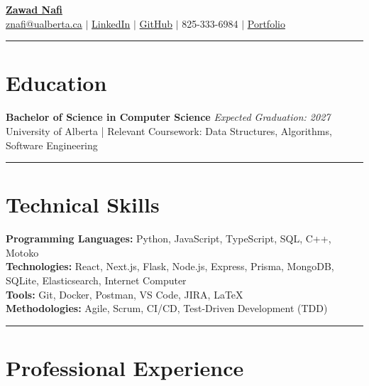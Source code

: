 \documentclass[a4paper,10pt]{article}
\begin{document}
\begin{center}
    {\LARGE \textbf{\href{https://myportfolioxznafi.vercel.app/}{Zawad Nafi}}} \\
    \vspace{2mm}
    \small
    \href{mailto:znafi@ualberta.ca}{znafi@ualberta.ca} \hspace{3mm} $\vert$ \hspace{3mm}
    \href{https://www.linkedin.com/in/zawad-nafi-30b25a352/}{LinkedIn} \hspace{3mm} $\vert$ \hspace{3mm}
    \href{https://github.com/znafi}{GitHub} \hspace{3mm} $\vert$ \hspace{3mm} 825-333-6984\hspace{3mm} $\vert$ \href{https://myportfolioxznafi.vercel.app/}{Portfolio}
\end{center}
\vspace{-4mm}
\hrule \vspace{6pt}

\section*{Education}
\textbf{Bachelor of Science in Computer Science} \hfill \textit{Expected Graduation: 2027} \\
University of Alberta | Relevant Coursework: Data Structures, Algorithms, Software Engineering
\vspace{6pt}
\hrule \vspace{6pt}

\section*{Technical Skills}
\textbf{Programming Languages:} Python, JavaScript, TypeScript, SQL, C++, Motoko \\
\textbf{Technologies:} React, Next.js, Flask, Node.js, Express, Prisma, MongoDB, SQLite, Elasticsearch, Internet Computer \\
\textbf{Tools:} Git, Docker, Postman, VS Code, JIRA, LaTeX \\
\textbf{Methodologies:} Agile, Scrum, CI/CD, Test-Driven Development (TDD)
\vspace{6pt}
\hrule \vspace{6pt}

\section*{Professional Experience}
\end{document}

